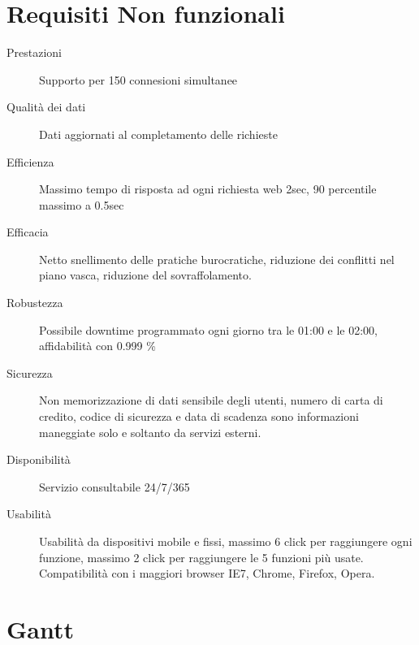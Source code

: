 \documentclass[11pt]{article} %
\begin{document}
\section{Requisiti Non funzionali}

\begin{description}
	\item[Prestazioni] Supporto per 150 connesioni simultanee
	\item[Qualità dei dati] Dati aggiornati al completamento delle richieste
	\item[Efficienza] Massimo tempo di risposta ad ogni richiesta web 2sec, 90 percentile massimo a 0.5sec
	\item[Efficacia] Netto snellimento delle pratiche burocratiche, riduzione dei conflitti nel piano vasca, riduzione del sovraffolamento.
	\item[Robustezza] Possibile downtime programmato ogni giorno tra le 01:00 e le 02:00, affidabilità con 0.999 \%
	\item[Sicurezza] Non memorizzazione di dati sensibile degli utenti, numero di carta di credito, codice di sicurezza e data di scadenza sono informazioni maneggiate solo e soltanto da servizi esterni.
	\item[Disponibilità] Servizio consultabile 24/7/365
	\item[Usabilità] Usabilità da dispositivi mobile e fissi, massimo 6 click per raggiungere ogni funzione, massimo 2 click per raggiungere le 5 funzioni più usate. Compatibilità con i maggiori browser IE7, Chrome, Firefox, Opera.
\end{description}


\section{Gantt}
\end{document}

